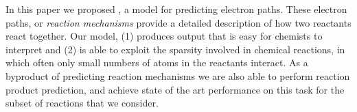 
In this paper we proposed \ourModel, a model for predicting electron paths.
These electron paths, or {\em reaction mechanisms} provide a detailed description of how two reactants react together. 
Our model, (1) produces output that is easy for chemists to interpret and (2) is able to exploit the sparsity involved in chemical reactions, in which often only small numbers of atoms in the reactants interact.
As a byproduct of predicting reaction mechanisms we are also able to perform reaction product prediction,
 and achieve state of the art performance on this task for the subset of reactions that we consider.